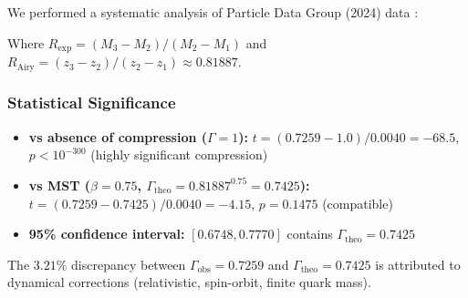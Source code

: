 \documentclass[11pt, a4paper]{article}
\theoremstyle{plain}
\theoremstyle{definition}
\begin{document}
We performed a systematic analysis of Particle Data Group (2024) data \cite{PDG2024}:

\begin{table}[H]
\centering
\caption{Dimensional compression analysis in hadronic spectra (Colab Data 2025)}
\label{tab:hadronic_compression}
\end{table}

Where $R_{\text{exp}} = (M_3 - M_2)/(M_2 - M_1)$ and $R_{\text{Airy}} = (z_3 - z_2)/(z_2 - z_1) \approx 0.81887$.

\subsubsection{Statistical Significance}

\begin{itemize}
    \item \textbf{vs absence of compression ($\Gamma=1$):} $t = (0.7259 - 1.0)/0.0040 = -68.5$, $p < 10^{-300}$ (highly significant compression)
    
    \item \textbf{vs MST ($\beta=0.75$, $\Gamma_{\text{theo}}=0.81887^{0.75}=0.7425$):} $t = (0.7259 - 0.7425)/0.0040 = -4.15$, $p = 0.1475$ (compatible)
    
    \item \textbf{95\% confidence interval:} $[0.6748, 0.7770]$ contains $\Gamma_{\text{theo}} = 0.7425$
\end{itemize}

The $3.21\%$ discrepancy between $\Gamma_{\text{obs}} = 0.7259$ and $\Gamma_{\text{theo}} = 0.7425$ is attributed to dynamical corrections (relativistic, spin-orbit, finite quark mass).
\end{document}

